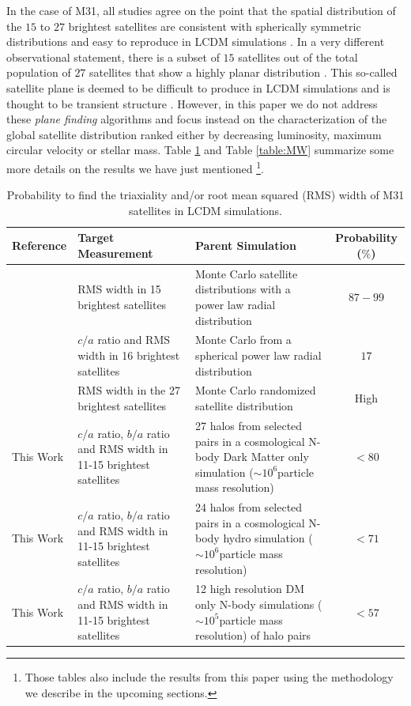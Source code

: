 \documentclass[a4paper,fleqn,usenatbib]{mnras}
\newcommand{\Msun}{{\ifmmode{{\rm{M_{\odot}}}}\else{${\rm{M_{\odot}}}$}\fi}}
\begin{document}
In the case of M31, all studies agree on the point that the spatial
distribution of the $15$ to $27$ brightest satellites  are consistent with
spherically symmetric distributions and easy to reproduce in LCDM simulations
\citep{2006AJ....131.1405K,2007MNRAS.374.1125M, 2013ApJ...766..120C}.
In a very different observational statement, there is a subset of $15$
satellites out of the total population of $27$ satellites that show a
highly planar distribution
\citep{2013ApJ...766..120C,2013Natur.493...62I,2015ApJ...799L..13C}.
This so-called satellite plane is deemed to be difficult to produce in
LCDM simulations and is thought to be transient structure
\citep{2015MNRAS.452.3838C,2015ApJ...809...49B,2015ApJ...800...34G,2016MNRAS.460.4348B,2017MNRAS.466.3119A,2017MNRAS.465..641F}.  
However, in this paper we do not address these \emph{plane finding}
algorithms and focus instead on the characterization of the global
satellite distribution ranked either by decreasing luminosity, maximum
circular velocity or stellar mass. 
Table \ref{table:M31} and Table \ref{table:MW} summarize some more
details on the results we have just mentioned \footnote{
Those tables also include the results from this paper using the
methodology we describe in the upcoming sections.}.





\begin{table}
\centering
\begin{tabular}{|p{4.0cm}|p{4.5cm}| p{5.5cm}| c|}\hline
Reference & Target Measurement & Parent Simulation & Probability ($\%$)\\\hline
\text{\cite{2006AJ....131.1405K}} & RMS width in 15 brightest
satellites & Monte Carlo satellite distributions with a power law
radial distribution & $87-99$\\
\text{\cite{2007MNRAS.374.1125M}} & $c/a$ ratio and RMS width in 16 brightest satellites & Monte Carlo from a spherical power law radial
distribution & $17$\\
\text{\cite{2013ApJ...766..120C}}& RMS width in the 27 brightest
satellites & Monte Carlo randomized satellite distribution & High\\
This Work & $c/a$ ratio, $b/a$ ratio and RMS width in 11-15 brightest
satellites & 27 halos from selected pairs in a cosmological N-body Dark Matter only simulation ($\sim
10^{6}$\Msun particle mass resolution)& $<80$ \\
This Work & $c/a$ ratio, $b/a$ ratio and RMS width in 11-15 brightest
satellites & 24 halos from selected pairs in a cosmological N-body hydro simulation ($\sim
10^{6}$\Msun particle mass resolution)& $<71$ \\
This Work & $c/a$ ratio, $b/a$ ratio and RMS width in 11-15 brightest
satellites & 12 high resolution DM only N-body simulations ($\sim
10^{5}$\Msun particle mass resolution) of halo pairs & $<57$ \\
\hline
\end{tabular}
\caption{Probability to find  the triaxiality and/or root mean squared
  (RMS) width of M31 satellites in LCDM simulations. 
\label{table:M31}}
\end{table}
\end{document}
